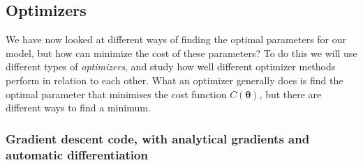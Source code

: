 \documentclass[reprint,english,notitlepage]{revtex4-2}  %
\begin{document}
\subsection{Optimizers}

We have now looked at different ways of finding the optimal parameters for our model, but how can minimize the cost of these parameters? To do this we will use different types of \textit{optimizers}, and study how well different optimizer methods perform in relation to each other. What an optimizer generally does is find the optimal parameter that minimises the cost function $C(\bm{\theta})$, but there are different ways to find a minimum. 

\subsubsection{Gradient descent code, with analytical gradients and automatic differentiation} %
\end{document}
